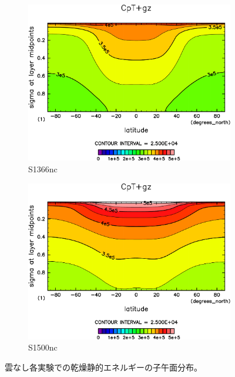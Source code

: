 \documentclass[body]{subfiles}
\begin{document}
\begin{figure}[t]
	\centering
	\begin{subfigure}{.4\textwidth}
		\centering
		\includegraphics[width=\columnwidth]{S1366-nc/CpT+gz,time=3650:4015-crop-rotate.pdf}
		\caption{S1366nc}\label{CpT+gzS1366nc}
	\end{subfigure}
	\begin{subfigure}{.4\textwidth}
		\centering
		\includegraphics[width=\columnwidth]{S1500-nc/CpT+gz,time=3650:4015-crop-rotate.pdf}
		\caption{S1500nc}\label{CpT+gzS1500nc}
	\end{subfigure}
	\caption[雲なし各実験での乾燥静的エネルギーの子午面分布]{
		雲なし各実験での乾燥静的エネルギーの子午面分布。
	}\label{Cp+gznc}
\end{figure}
\end{document}
